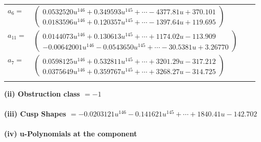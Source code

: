 \documentclass[1p]{elsarticle_modified}
\theoremstyle{definition}
\begin{document}
\begin{tabular}{m{7pt} m{180pt} m{7pt} m{180pt} }
\flushright $a_{6}=$&$\begin{pmatrix}0.0532520 u^{146}+0.349593 u^{145}+\cdots-4377.81 u+370.101\\0.0183596 u^{146}+0.120357 u^{145}+\cdots-1397.64 u+119.695\end{pmatrix}$ \\
\flushright $a_{11}=$&$\begin{pmatrix}0.0144073 u^{146}+0.130613 u^{145}+\cdots+1174.02 u-113.909\\-0.00642001 u^{146}-0.0543650 u^{145}+\cdots-30.5381 u+3.26770\end{pmatrix}$ \\
\flushright $a_{7}=$&$\begin{pmatrix}0.0598125 u^{146}+0.532811 u^{145}+\cdots+3201.29 u-317.212\\0.0375649 u^{146}+0.359767 u^{145}+\cdots+3268.27 u-314.725\end{pmatrix}$\\&\end{tabular}
\flushleft \textbf{(ii) Obstruction class $= -1$}\\~\\
\flushleft \textbf{(iii) Cusp Shapes $= -0.0203121 u^{146}-0.141621 u^{145}+\cdots+1840.41 u-142.702$}\\~\\
\newpage\renewcommand{\arraystretch}{1}
\flushleft \textbf{(iv) u-Polynomials at the component}\newline \\
\end{document}

